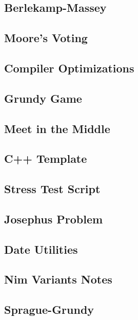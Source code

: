 \documentclass[10pt,letterpaper,landscape,twocolumn]{article}
\begin{document}
\subsection{Berlekamp-Massey}

\subsection{Moore's Voting}

\subsection{Compiler Optimizations}

\subsection{Grundy Game}

\subsection{Meet in the Middle}

\subsection{C++ Template}

\subsection{Stress Test Script}

\subsection{Josephus Problem}

\subsection{Date Utilities}

\subsection{Nim Variants Notes}


\subsection{Sprague-Grundy}

\end{document}

